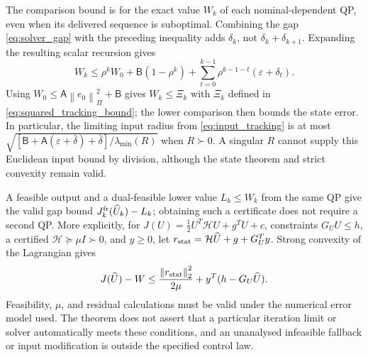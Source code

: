 \documentclass[journal]{IEEEtran}
\theoremstyle{plain}
\theoremstyle{definition}
\newcommand{\norm}[1]{\left\lVert #1\right\rVert}
\begin{document}
The comparison bound is for the exact value $W_k$ of each nominal-dependent QP, even when its delivered sequence is suboptimal. Combining the gap \eqref{eq:solver_gap} with the preceding inequality adds $\delta_k$, not $\delta_k+\delta_{k+1}$. Expanding the resulting scalar recursion gives
\begin{equation*}
W_k\le\rho^kW_0+\mathsf B(1-\rho^k)
+\sum_{t=0}^{k-1}\rho^{k-1-t}(\varepsilon+\delta_t).
\end{equation*}
Using $W_0\le\mathsf A\norm{e_0}_\Pi^2+\mathsf B$ gives $W_k\le\Xi_k$ with $\Xi_k$ defined in \eqref{eq:squared_tracking_bound}; the lower comparison then bounds the state error. In particular, the limiting input radius from \eqref{eq:input_tracking} is at most $\sqrt{[\mathsf B+\mathsf A(\varepsilon+\bar\delta)+\bar\delta]/\lambda_{\min}(R)}$ when $R\succ0$. A singular $R$ cannot supply this Euclidean input bound by division, although the state theorem and strict convexity remain valid.

A feasible output and a dual-feasible lower value $L_k\le W_k$ from the same QP give the valid gap bound $J_k^{\rm fr}(\widehat U_k)-L_k$; obtaining such a certificate does not require a second QP. More explicitly, for $J(U)=\tfrac12U^T\mathcal HU+g^TU+c$, constraints $G_UU\le h$, a certified $\mathcal H\succeq\mu I\succ0$, and $y\ge0$, let $r_{\rm stat}=\mathcal H\widehat U+g+G_U^Ty$. Strong convexity of the Lagrangian gives
\begin{equation*}
J(\widehat U)-W\le\frac{\norm{r_{\rm stat}}_2^2}{2\mu}
+y^T(h-G_U\widehat U).
\end{equation*}
Feasibility, $\mu$, and residual calculations must be valid under the numerical error model used. The theorem does not assert that a particular iteration limit or solver automatically meets these conditions, and an unanalysed infeasible fallback or input modification is outside the specified control law.
\end{document}
